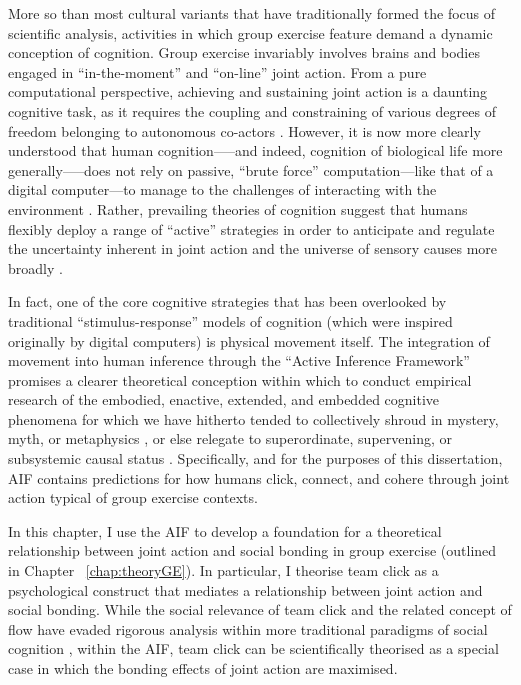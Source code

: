 \begin{CJK}{UTF8}{gbsn}
More so than most cultural variants that have traditionally formed the focus of scientific analysis, activities in which group exercise feature demand a dynamic conception of cognition.  Group exercise invariably involves brains and bodies engaged in ``in-the-moment'' and ``on-line'' joint action.  From a pure computational perspective, achieving and sustaining joint action is a daunting cognitive task, as it requires the coupling and constraining of various degrees of freedom belonging to autonomous co-actors \citep{Bernstein1967,Turvey1978}.  However, it is now more clearly understood that human cognition—--and indeed, cognition of biological life more generally—--does not rely on passive, ``brute force'' computation---like that of a digital computer---to manage to the challenges of interacting with the environment \citep{Yufik2013}.  Rather, prevailing theories of cognition suggest that humans flexibly deploy a range of ``active'' strategies in order to anticipate and regulate the uncertainty inherent in joint action and the universe of sensory causes more broadly \citep{Clark2015}.

In fact, one of the core cognitive strategies that has been overlooked by traditional ``stimulus-response'' models of cognition (which were inspired originally by digital computers) is physical movement itself.  The integration of movement into human inference through the ``Active Inference Framework'' \citep[hereafter AIF cf.][]{Friston2010} promises a clearer theoretical conception within which to conduct empirical research of the embodied, enactive, extended, and embedded cognitive phenomena for which we have hitherto tended to collectively shroud in mystery, myth, or metaphysics  \citep{Atran2010}, or else relegate to superordinate, supervening, or subsystemic causal status   \citep{Clark2015,Linson2018}.  Specifically, and for the purposes of this dissertation, AIF contains predictions for how humans click, connect, and cohere through joint action typical of group exercise contexts.

In this chapter, I use the AIF to develop a foundation for a theoretical relationship between joint action and social bonding in group exercise (outlined in Chapter ~\ref{chap:theoryGE}).  In particular, I theorise team click as a psychological construct that mediates a relationship between joint action and social bonding.  While the social relevance of team click and the related concept of flow have evaded rigorous analysis within more traditional paradigms of social cognition \cite[for explanations as to why, see][]{Dietrich2004,Slingerland2014}, within the AIF, team click can be scientifically theorised as a special case in which the bonding effects of joint action are maximised.


\end{CJK}
